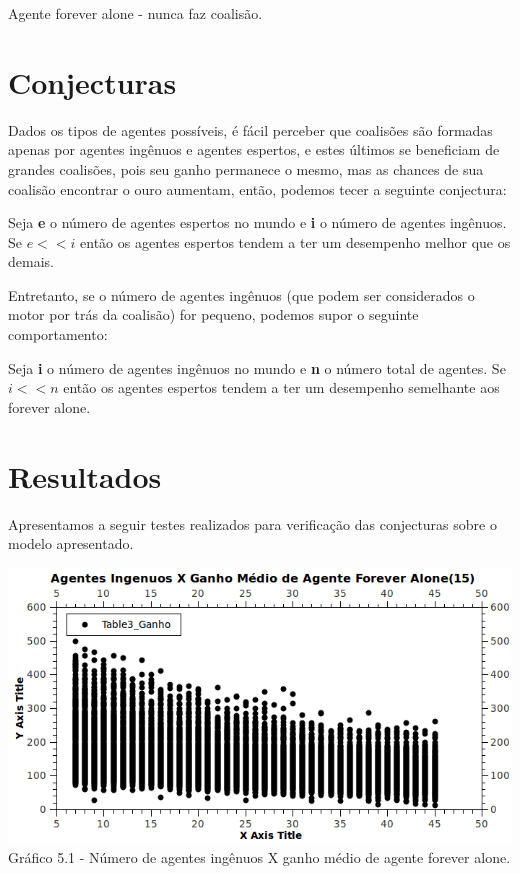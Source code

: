 \documentclass[11pt,reqno]{article}
\begin{document}
\begin{definition}
 Agente forever alone - nunca faz coalisão.
\end{definition}

\section{Conjecturas}

Dados os tipos de agentes possíveis, é fácil perceber que coalisões são formadas apenas por agentes ingênuos e agentes espertos, e estes últimos se beneficiam de
grandes coalisões, pois seu ganho permanece o mesmo, mas as chances de sua coalisão encontrar o ouro aumentam, então, podemos tecer a seguinte conjectura:

\begin{conjecture}
 Seja \textbf{e} o número de agentes espertos no mundo e \textbf{i} o número de agentes ingênuos.
Se $e << i$ então os agentes espertos tendem a ter um desempenho melhor que os demais.
\end{conjecture}


Entretanto, se o número de agentes ingênuos (que podem ser considerados o motor por trás da coalisão) for pequeno, podemos supor o seguinte comportamento:

\begin{conjecture}
 Seja \textbf{i} o número de agentes ingênuos no mundo e \textbf{n} o número total de agentes.
 Se $i << n$ então os agentes espertos tendem a ter um desempenho semelhante aos forever alone.
\end{conjecture}

\section{Resultados}

Apresentamos a seguir testes realizados para verificação das conjecturas sobre o modelo apresentado.

\begin{center}
 \includegraphics[scale=0.5]{Figuras/GanhoFA15.png}\\
 \scriptsize{Gráfico 5.1 - Número de agentes ingênuos X ganho médio de agente forever alone.}
\end{center}
\end{document}
